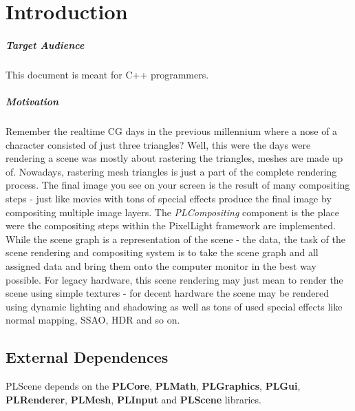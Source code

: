 \chapter{Introduction}


\paragraph{Target Audience}
This document is meant for C++ programmers.


\paragraph{Motivation}
Remember the realtime CG days in the previous millennium where a nose of a character consisted of just three triangles? Well, this were the days were rendering a scene was mostly about rastering the triangles, meshes are made up of. Nowadays, rastering mesh triangles is just a part of the complete rendering process. The final image you see on your screen is the result of many compositing steps - just like movies with tons of special effects produce the final image by compositing multiple image layers. The \emph{PLCompositing} component is the place were the compositing steps within the PixelLight framework are implemented. While the scene graph is a representation of the scene - the data, the task of the scene rendering and compositing system is to take the scene graph and all assigned data and bring them onto the computer monitor in the best way possible. For legacy hardware, this scene rendering may just mean to render the scene using simple textures - for decent hardware the scene may be rendered using dynamic lighting and shadowing as well as tons of used special effects like normal mapping, SSAO, HDR and so on.




\section{External Dependences}
PLScene depends on the \textbf{PLCore}, \textbf{PLMath}, \textbf{PLGraphics}, \textbf{PLGui}, \textbf{PLRenderer}, \textbf{PLMesh}, \textbf{PLInput} and \textbf{PLScene} libraries.
